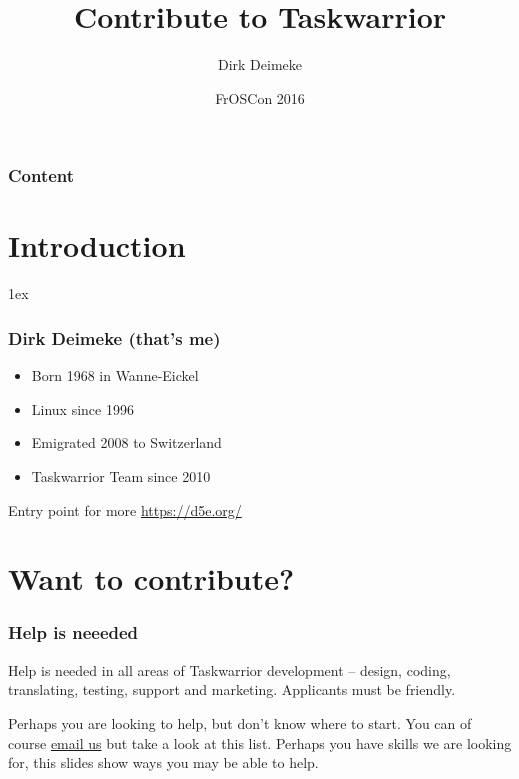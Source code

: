 \documentclass[t,handout]{beamer}
\title{Contribute to Taskwarrior}
\author[Deimeke, Dirk]{Dirk Deimeke}
\institute[Taskwarrior academy]{Taskwarrior academy}
\date{FrOSCon 2016}
\begin{document}
\begin{frame} %
	\titlepage
\end{frame}


\begin{frame}\frametitle{Content}
	\tableofcontents
\end{frame}

\section{Introduction}

\parskip1ex

\begin{frame}[fragile]\frametitle{Dirk Deimeke (that's me)}
    \begin{itemize}
        \item Born 1968 in Wanne-Eickel
        \item Linux since 1996
        \item Emigrated 2008 to Switzerland
        \item Taskwarrior Team since 2010
    \end{itemize}

    Entry point for more \url{https://d5e.org/}
\end{frame}

\section{Want to contribute?}

\begin{frame}[fragile]\frametitle{Help is neeeded}
    \vfill
    Help is needed in all areas of Taskwarrior development -- design, coding, translating, testing, support and marketing. Applicants must be friendly.

    Perhaps you are looking to help, but don't know where to start. You can of course \href{mailto:taskwarrior-dev@googlegroups.com}{email us} but take a look at this list. Perhaps you have skills we are looking for, this slides show ways you may be able to help.
    \vfill
\end{frame}
\end{document}
